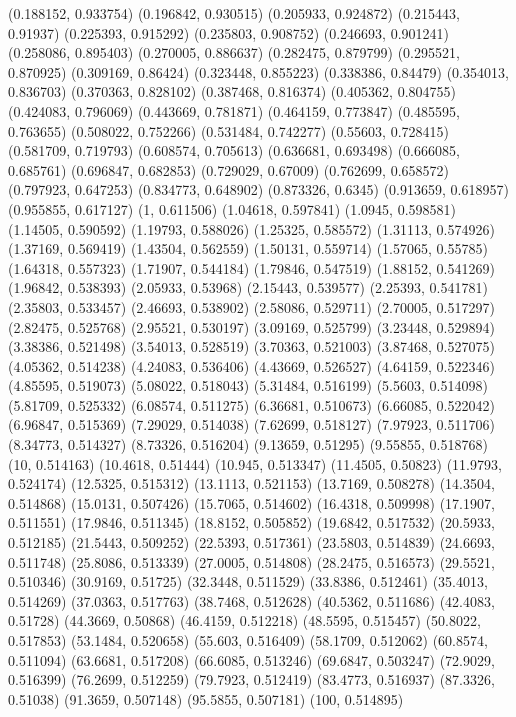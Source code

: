 {(0.188152, 0.933754)
(0.196842, 0.930515)
(0.205933, 0.924872)
(0.215443, 0.91937)
(0.225393, 0.915292)
(0.235803, 0.908752)
(0.246693, 0.901241)
(0.258086, 0.895403)
(0.270005, 0.886637)
(0.282475, 0.879799)
(0.295521, 0.870925)
(0.309169, 0.86424)
(0.323448, 0.855223)
(0.338386, 0.84479)
(0.354013, 0.836703)
(0.370363, 0.828102)
(0.387468, 0.816374)
(0.405362, 0.804755)
(0.424083, 0.796069)
(0.443669, 0.781871)
(0.464159, 0.773847)
(0.485595, 0.763655)
(0.508022, 0.752266)
(0.531484, 0.742277)
(0.55603, 0.728415)
(0.581709, 0.719793)
(0.608574, 0.705613)
(0.636681, 0.693498)
(0.666085, 0.685761)
(0.696847, 0.682853)
(0.729029, 0.67009)
(0.762699, 0.658572)
(0.797923, 0.647253)
(0.834773, 0.648902)
(0.873326, 0.6345)
(0.913659, 0.618957)
(0.955855, 0.617127)
(1, 0.611506)
(1.04618, 0.597841)
(1.0945, 0.598581)
(1.14505, 0.590592)
(1.19793, 0.588026)
(1.25325, 0.585572)
(1.31113, 0.574926)
(1.37169, 0.569419)
(1.43504, 0.562559)
(1.50131, 0.559714)
(1.57065, 0.55785)
(1.64318, 0.557323)
(1.71907, 0.544184)
(1.79846, 0.547519)
(1.88152, 0.541269)
(1.96842, 0.538393)
(2.05933, 0.53968)
(2.15443, 0.539577)
(2.25393, 0.541781)
(2.35803, 0.533457)
(2.46693, 0.538902)
(2.58086, 0.529711)
(2.70005, 0.517297)
(2.82475, 0.525768)
(2.95521, 0.530197)
(3.09169, 0.525799)
(3.23448, 0.529894)
(3.38386, 0.521498)
(3.54013, 0.528519)
(3.70363, 0.521003)
(3.87468, 0.527075)
(4.05362, 0.514238)
(4.24083, 0.536406)
(4.43669, 0.526527)
(4.64159, 0.522346)
(4.85595, 0.519073)
(5.08022, 0.518043)
(5.31484, 0.516199)
(5.5603, 0.514098)
(5.81709, 0.525332)
(6.08574, 0.511275)
(6.36681, 0.510673)
(6.66085, 0.522042)
(6.96847, 0.515369)
(7.29029, 0.514038)
(7.62699, 0.518127)
(7.97923, 0.511706)
(8.34773, 0.514327)
(8.73326, 0.516204)
(9.13659, 0.51295)
(9.55855, 0.518768)
(10, 0.514163)
(10.4618, 0.51444)
(10.945, 0.513347)
(11.4505, 0.50823)
(11.9793, 0.524174)
(12.5325, 0.515312)
(13.1113, 0.521153)
(13.7169, 0.508278)
(14.3504, 0.514868)
(15.0131, 0.507426)
(15.7065, 0.514602)
(16.4318, 0.509998)
(17.1907, 0.511551)
(17.9846, 0.511345)
(18.8152, 0.505852)
(19.6842, 0.517532)
(20.5933, 0.512185)
(21.5443, 0.509252)
(22.5393, 0.517361)
(23.5803, 0.514839)
(24.6693, 0.511748)
(25.8086, 0.513339)
(27.0005, 0.514808)
(28.2475, 0.516573)
(29.5521, 0.510346)
(30.9169, 0.51725)
(32.3448, 0.511529)
(33.8386, 0.512461)
(35.4013, 0.514269)
(37.0363, 0.517763)
(38.7468, 0.512628)
(40.5362, 0.511686)
(42.4083, 0.51728)
(44.3669, 0.50868)
(46.4159, 0.512218)
(48.5595, 0.515457)
(50.8022, 0.517853)
(53.1484, 0.520658)
(55.603, 0.516409)
(58.1709, 0.512062)
(60.8574, 0.511094)
(63.6681, 0.517208)
(66.6085, 0.513246)
(69.6847, 0.503247)
(72.9029, 0.516399)
(76.2699, 0.512259)
(79.7923, 0.512419)
(83.4773, 0.516937)
(87.3326, 0.51038)
(91.3659, 0.507148)
(95.5855, 0.507181)
(100, 0.514895)
}

